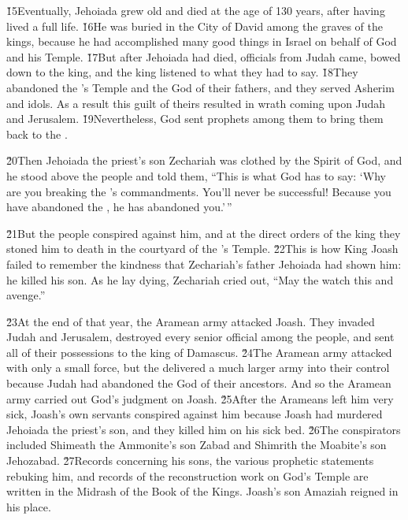 \v{15}Eventually, Jehoiada grew old and died at the age of 130 years, after having lived a full life. \v{16}He was buried in the City of David among the graves of the kings, because he had accomplished many good things in Israel on behalf of God and his Temple. \v{17}But after Jehoiada had died, officials from Judah came, bowed down to the king, and the king listened to what they had to say. \v{18}They abandoned the 's Temple and the God of their fathers, and they served Asherim and idols. As a result this guilt of theirs resulted in wrath coming upon Judah and Jerusalem. \v{19}Nevertheless, God sent prophets among them to bring them back to the .

\v{20}Then Jehoiada the priest's son Zechariah was clothed by the Spirit of God, and he stood above the people and told them, ``This is what God has to say: `Why are you breaking the 's commandments. You'll never be successful! Because you have abandoned the , he has abandoned you.'\,''

\v{21}But the people conspired against him, and at the direct orders of the king they stoned him to death in the courtyard of the 's Temple. \v{22}This is how King Joash failed to remember the kindness that Zechariah's father Jehoiada had shown him: he killed his son. As he lay dying, Zechariah cried out, ``May the  watch this and avenge.''

\v{23}At the end of that year, the Aramean army attacked Joash. They invaded Judah and Jerusalem, destroyed every senior official among the people, and sent all of their possessions to the king of Damascus. \v{24}The Aramean army attacked with only a small force, but the  delivered a much larger army into their control because Judah had abandoned the  God of their ancestors. And so the Aramean army carried out God's judgment on Joash. \v{25}After the Arameans left him very sick, Joash's own servants conspired against him because Joash had murdered Jehoiada the priest's son, and they killed him on his sick bed. \v{26}The conspirators included Shimeath the Ammonite's son Zabad and Shimrith the Moabite's son Jehozabad. \v{27}Records concerning his sons, the various prophetic statements rebuking him, and records of the reconstruction work on God's Temple are written in the Midrash of the Book of the Kings. Joash's son Amaziah reigned in his place.

